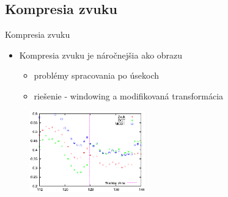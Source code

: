 \documentclass{beamer}
\begin{document}
\subsection{Kompresia zvuku}
\begin{frame}{Kompresia zvuku}
    \begin{itemize}
        \item Kompresia zvuku je náročnejšia ako obrazu
            \begin{itemize}
            \item problémy spracovania po úsekoch
            \item riešenie - windowing a modifikovaná transformácia
            \end{itemize}
    \end{itemize}
    \begin{figure}
        \includegraphics[width=5cm]{obrazky/dct_vs_mdct}
    \end{figure}
\end{frame}

\end{document}
